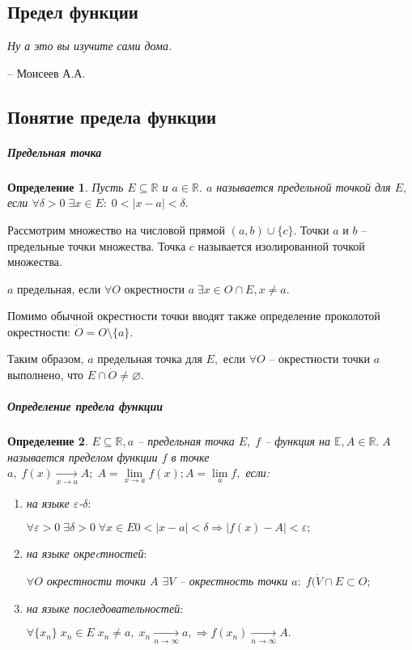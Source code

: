 \documentclass{article}
\newtheorem{Definition}{Определение}[section]
\begin{document}
\begin{center}
\section{\LARGE{\bf Предел функции}}
\end{center}
\epigraph{\textit{Ну а это вы изучите сами дома.}}
{-- Моисеев А.А.}
\subsection{Понятие предела функции}
\subparagraph{Предельная точка}
\begin{Definition}
Пусть $E\subseteq\mathbb{R}$ и $a\in\mathbb{R}.$ $a$ называется предельной точкой для $E,$ если $\forall\delta> 0\;\exists x\in E: \; 0<\mid x-a\mid<\delta.$
\end{Definition}

Рассмотрим множество на числовой прямой $(a, b)\cup\{c\}.$ Точки $a$ и $b$ -- предельные точки множества. Точка $c$ называется изолированной точкой множества.



$a$ предельная, если $\forall O$ окрестности $a \; \exists x\in O\cap E, x \neq a.$

Помимо обычной окрестности точки вводят также определение проколотой окрестности: $\dot{O} = O\setminus\{a\}.$

Таким образом, $a$ предельная точка для $E,$ если $\forall O$ -- окрестности точки $a$ выполнено, что $E\cap\dot{O}\neq\varnothing.$

\subparagraph{Определение предела функции}

\begin{Definition}
$E\subseteq\mathbb{R}, a$ -- предельная точка $E, \; f$ -- функция на $\mathbb{E}, A\in\mathbb{R}. \; A$ называется пределом функции $f$ в точке $a, \;f(x)\xrightarrow[x\rightarrow a]{} A; \; A=\lim\limits_{x\rightarrow a} f(x); A=\lim\limits_{a}f,$ если:
\begin{enumerate}
\item на языке $\varepsilon$-$\delta:$

$\forall \varepsilon > 0 \;\exists \delta > 0\;\forall x\in E 0<\mid x-a\mid<\delta \Rightarrow \mid f(x)-A\mid<\varepsilon;$

\item на языке окреcтностей$:$

$\forall O$ окрестности точки $A$ $\exists V$ -- окрестность точки $a: \; f(\dot{V}\cap E \subset O;$

\item на языке последовательностей$:$

$\forall\{x_n\} \; x_n\in E \; x_n \neq a, \; x_n\xrightarrow[n \rightarrow \infty]{} a,  \Rightarrow f(x_n)\xrightarrow[n\rightarrow\infty]{} A.$
\end{enumerate}
\end{Definition}
\end{document}

